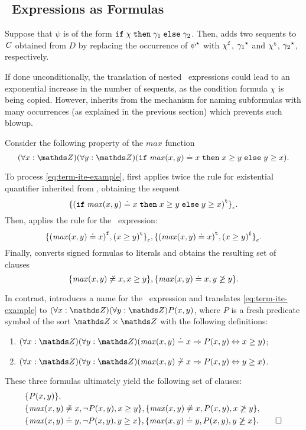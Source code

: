 \subsection*{\ITE\ Expressions as Formulas}
Suppose that $\psi$ is of the form $\mathtt{if}\;{\chi}\;\allowbreak\mathtt{then}\;{\gamma_1}\;\allowbreak\mathtt{else}\;{\gamma_2}$. 
Then, \nfcnf{} adds two sequents to $\mathit{C}$ obtained from $D$ by replacing the occurrence of ${\psi}^{\star}$ with ${\chi}^{\mathtt{f}}$, ${\gamma_1}^{\star}$ and ${\chi}^{\mathtt{t}}$, ${\gamma_2}^{\star}$, respectively.

If done unconditionally, the translation of nested \ITE\ expressions could lead to an exponential increase in the number of sequents,
as the condition formula $\chi$ is being copied. However, \nfcnf{} inherits from \newcnf{} the mechanism 
for naming subformulas with many occurrences (as explained in the previous section) which prevents such blowup.

\begin{example} Consider the following property of the $\mathit{max}$ function
\begin{equation}\label{eq:term-ite-example}
  (\forall x:\Z)(\forall y:\Z)(\ite{\mathit{max}(x, y) \eql x}{x \geq y}{y \geq x}).
\end{equation}

To process \eqref{eq:term-ite-example}, \nfcnf{} first applies twice the rule for existential quantifier inherited from \newcnf{}, obtaining the sequent $${{\{(\mathtt{if}\;{\mathit{max}(x, y) \doteq x}\;\allowbreak\mathtt{then}\;{x \geq y}\;\allowbreak\mathtt{else}\;{y \geq x})}^{\mathtt{t}}\}}_{\epsilon}.$$ Then, \nfcnf{} applies the rule for the \ITE\ expression: $${ \{ {(\mathit{max}(x,y) \doteq x)}^{\mathtt{f}} , {(x \geq y)}^{\mathtt{t}} \} }_{\epsilon}, { \{ {(\mathit{max}(x,y) \doteq x)}^{\mathtt{t}} , {(x \geq y)}^{\mathtt{f}} \} }_{\epsilon}.$$ Finally, \nfcnf{} converts signed formulas to literals and obtains the resulting set of clauses $$\{ \mathit{max}(x,y) \not\doteq x, x \geq y \}, \{ \mathit{max}(x,y) \doteq x, y \not\geq y \}.$$

In contrast, \oldcnf{} introduces a name for the \ITE\ expression and translates \eqref{eq:term-ite-example} to $(\forall x:\Z)(\forall y:\Z)P(x,y)$, where $P$ is a fresh predicate symbol of the sort $\Z \times \Z$ with the following definitions:
\begin{enumerate}
  \item $(\forall x:\Z)(\forall y:\Z)(\mathit{max}(x, y) \eql     x \implies P(x,y) \liff x \geq y)$;
  \item $(\forall x:\Z)(\forall y:\Z)(\mathit{max}(x, y) \not\eql x \implies P(x,y) \liff y \geq x)$.
\end{enumerate}

These three formulas ultimately yield the following set of clauses:
\begin{align*}
&\{P(x,y)\},\\
&\{\mathit{max}(x, y) \not\eql x, \neg P(x,y), x \geq y\},\{\mathit{max}(x, y) \not\eql x, P(x,y), x \not\geq y\},\\
&\{\mathit{max}(x, y) \eql y, \neg P(x,y), y \geq x\},\{\mathit{max}(x, y) \eql y, P(x,y), y \not\geq x\}.\QED
\end{align*}
\end{example}

